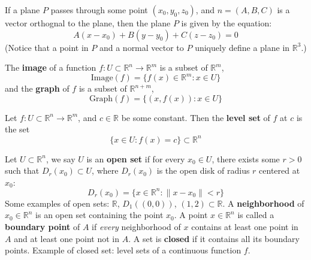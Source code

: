 \documentclass[openany]{book}
\newcommand{\R}{\mathbb{R}}
\begin{document}
\begin{defn}[Plane in $\R^3$]\label{plane}
   If a plane ${P}$ passes through some point $(x_0,y_0,z_0)$, and $n=(A,B,C)$ is a vector orthognal to the plane, then the plane ${P}$ is given by the equation:
    \begin{equation*}
        A(x-x_0)+B(y-y_0)+C(z-z_0)=0
    \end{equation*}
    (Notice that a point in ${P}$ and a normal vector to ${P}$ uniquely define a plane in $\R^3$.)
\end{defn}


\begin{defn}
    The \textbf{image} of a function $f: U\subset\R^n\to\R^m$ is a subset of $\R^m$,
    \begin{equation*}
        \text{Image}(f)=\{f(x)\in\R^m: x\in U\}
    \end{equation*}
    and the \textbf{graph} of $f$ is a subset of $\R^{n+m}$,
    \begin{equation*}
        \text{Graph}(f)=\{(x,f(x)): x\in U\}
    \end{equation*}
\end{defn}


\begin{defn}
    Let $f:U\subset\R^n\to\R^m$, and $c\in\R$ be some constant. Then the \textbf{level set} of $f$ at $c$ is the set 
    \begin{equation*}
        \{x\in U: f(x)=c\}\subset\R^n
    \end{equation*}
\end{defn}

\begin{defn}
    Let $U\subset\R^n$, we say $U$ is an \textbf{open set} if for every $x_0\in U$, there exists some $r>0$ such that $D_r(x_0)\subset U$, where $D_r(x_0)$ is the open disk of radius $r$ centered at $x_0$:
    \begin{equation*}
        D_r(x_0)=\{x\in\R^n: \|x-x_0\|<r\}
    \end{equation*}
    Some examples of open sets: $\R$, $D_{1}((0,0))$, $(1,2)\subset\R$.
    A \textbf{neighborhood} of $x_0\in\R^n$ is an open set containing the point $x_0$. A point $x\in\R^n$ is called a \textbf{boundary point} of $A$ if \textit{every} neighborhood of $x$ contains at least one point in $A$ and at least one point not in $A$. A set is \textbf{closed} if it contains all its boundary points. Example of closed set: level sets of a continuous function $f$.
\end{defn}
\end{document}
